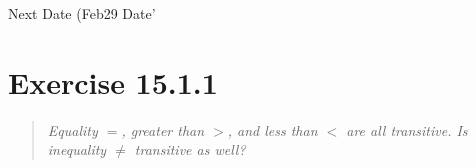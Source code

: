 \documentclass[10pt]{article}
\begin{document}

\begin{schema}{Next}
  \Delta Date
  \where
  (Feb29 \land \Theta Date'
\end{schema}

\tofinish



\section{Exercise 15.1.1}
\begin{quote}
  {\it
    Equality $=$, greater than $>$, and less than $<$ are all transitive. Is inequality $\neq$
    transitive as well?
  }
\end{quote}
\tostart
\end{document}
